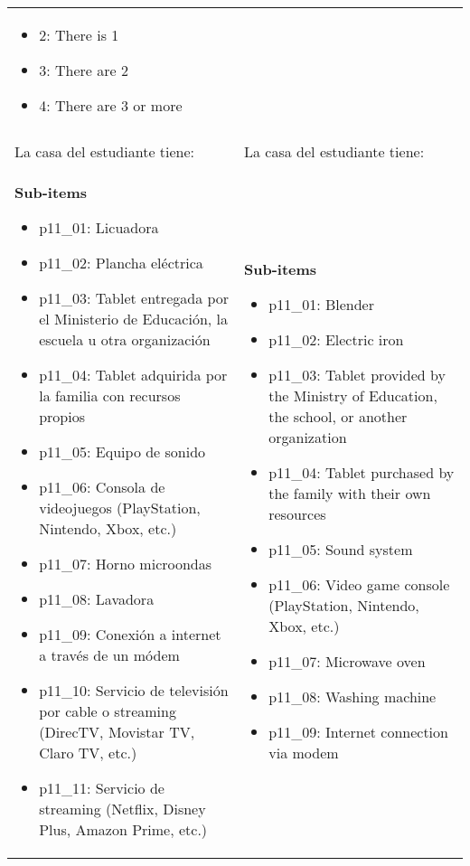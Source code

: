 \documentclass[11pt]{article}
\begin{document}
\begin{longtable}{@{}LL@{}}
\begin{itemize}[leftmargin=*]
\item 2: There is 1
\item 3: There are 2
\item 4: There are 3 or more\end{itemize} \\
\addlinespace[4pt]
 \\ 
La casa del estudiante tiene: & La casa del estudiante tiene: \\
\textbf{Sub-items}\par\begin{itemize}[leftmargin=*]\item p11\_01: Licuadora
\item p11\_02: Plancha eléctrica
\item p11\_03: Tablet entregada por el Ministerio de Educación, la escuela u otra organización
\item p11\_04: Tablet adquirida por la familia con recursos propios
\item p11\_05: Equipo de sonido
\item p11\_06: Consola de videojuegos (PlayStation, Nintendo, Xbox, etc.)
\item p11\_07: Horno microondas
\item p11\_08: Lavadora
\item p11\_09: Conexión a internet a través de un módem
\item p11\_10: Servicio de televisión por cable o streaming (DirecTV, Movistar TV, Claro TV, etc.)
\item p11\_11: Servicio de streaming (Netflix, Disney Plus, Amazon Prime, etc.)\end{itemize} & \textbf{Sub-items}\par\begin{itemize}[leftmargin=*]\item p11\_01: Blender
\item p11\_02: Electric iron
\item p11\_03: Tablet provided by the Ministry of Education, the school, or another organization
\item p11\_04: Tablet purchased by the family with their own resources
\item p11\_05: Sound system
\item p11\_06: Video game console (PlayStation, Nintendo, Xbox, etc.)
\item p11\_07: Microwave oven
\item p11\_08: Washing machine
\item p11\_09: Internet connection via modem

\end{itemize}
\end{longtable}
\end{document}
